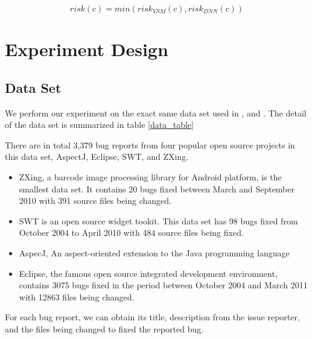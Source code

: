 \begin{equation}
risk(c) = min(risk_{VSM}(c) , risk_{DNN}(c) )
\end{equation}



 
\section{Experiment Design}

\subsection{Data Set }
We perform our experiment on the exact same data set used in \cite{wang2014version} ,\cite{saha2013improving} and \cite{zhou2012should}.
The detail of the data set is summarized in table \ref{data_table} 


There are in total 3,379 bug reports from four popular open source projects in this data set, AspectJ, Eclipse, SWT, and ZXing. 
\begin{itemize}
	\item ZXing, a barcode image processing library for Android platform, is the smallest data set.
	It contains 20 bugs fixed between March and September 2010 with 391 source files being changed.
	\item SWT is an open source widget tookit. 
	This data set has 98 bugs fixed from October 2004 to April 2010 with 484 source files being fixed. 
	\item AspecJ, An aspect-oriented extension to the Java programming language 
	\item Eclipse, the famous open source integrated development environment, contains 3075 bugs fixed in the period between October 2004 and March 2011 with 12863 files being changed.
\end{itemize}





For each bug report, we can obtain its title, description from the issue reporter, and the files being changed to fixed the reported bug. 

